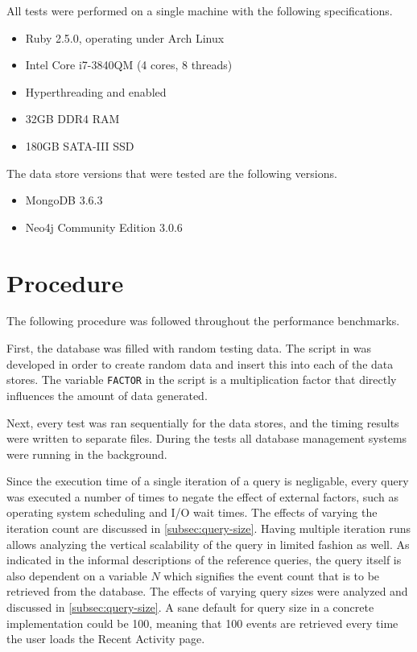 All tests were performed on a single machine with the following specifications.

\begin{itemize}
  \item Ruby 2.5.0, operating under Arch Linux
  \item Intel Core i7-3840QM (4 cores, 8 threads)
  \item Hyperthreading and  enabled
  \item 32GB DDR4 RAM
  \item 180GB SATA-III SSD
\end{itemize}

The data store versions that were tested are the following versions.

\begin{itemize}
  \item MongoDB 3.6.3
  \item Neo4j Community Edition 3.0.6
\end{itemize}

\section{Procedure}
\label{sec:procedure}

The following procedure was followed throughout the performance benchmarks.

First, the database was filled with random testing data.
The script in  was developed in order to create random data and insert this into each of the data stores.
The variable \texttt{FACTOR} in the script is a multiplication factor that directly influences the amount of data generated.

Next, every test was ran sequentially for the data stores, and the timing results were written to separate files.
During the tests all database management systems were running in the background.

Since the execution time of a single iteration of a query is negligable, every query was executed a number of times to negate the effect of external factors, such as operating system scheduling and I/O wait times.
The effects of varying the iteration count are discussed in \cref{subsec:query-size}.
Having multiple iteration runs allows analyzing the vertical scalability of the query in limited fashion as well.
As indicated in the informal descriptions of the reference queries, the query itself is also dependent on a variable $N$ which signifies the event count that is to be retrieved from the database.
The effects of varying query sizes were analyzed and discussed in \cref{subsec:query-size}.
A sane default for query size in a concrete implementation could be 100, meaning that 100 events are retrieved every time the user loads the Recent Activity page.

